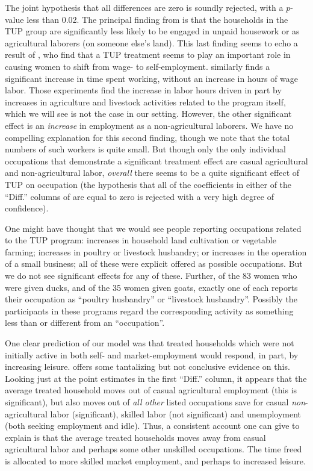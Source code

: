 \documentclass[11pt]{article}
\begin{document}
The joint hypothesis that all differences are zero is soundly
rejected, with a \(p\)-value less than 0.02.  The principal
finding from  is that the households in the TUP group
are significantly less likely to be engaged in unpaid housework or as
agricultural laborers (on someone else's land).  This last finding seems to
echo a result of \cite{bandiera2017}, who find that a TUP treatment
seems to play an important role in causing women to shift from wage-
to self-employment. \cite{banerjee2015} similarly finds a significant increase in
time spent working, without an increase in hours of wage labor. Those experiments
find the increase in labor hours driven in part by increases in agriculture and
livestock activities related to the program itself, which we will see is not the case
in our setting. However, the other significant effect is an
\emph{increase} in employment as a non-agricultural laborers.  We have no
compelling explanation for this second finding, though we note that
the total numbers of such workers is quite small.  But though only the
only individual occupations that demonstrate a significant treatment
effect are casual agricultural and non-agricultural labor, \emph{overall}
there seems to be a quite significant effect of TUP on occupation (the
hypothesis that all of the coefficients in either of the ``Diff.''  columns of
 are equal to zero is rejected with a very high degree
of confidence).

One might have thought that we would see people reporting occupations
related to the TUP program: increases in household land cultivation or
vegetable farming; increases in poultry or livestock husbandry; or
increases in the operation of a small business; all of these were
explicit offered as possible occupations.  But we do not see
significant effects for any of these. Further, of the 83 women who were
given ducks, and of the 35 women given goats, exactly one of each
reports their occupation as ``poultry husbandry'' or ``livestock
husbandry''.  Possibly the participants in these programs regard 
the corresponding activity as something less than or different from an
``occupation''.

One clear prediction of our model was that treated households which
were not initially active in both self- and market-employment would
respond, in part, by increasing leisure.   offers some
tantalizing but not conclusive evidence on this.  Looking just at the
point estimates in the first ``Diff.'' column, it appears that the
average treated household moves out of casual agricultural employment
(this is significant), but also moves out of \emph{all other} listed
occupations save for casual \emph{non}-agricultural labor (significant),
skilled labor (not significant) and unemployment (both seeking
employment and idle).  Thus, a consistent account one can give to explain
 is that the average treated households moves away
from casual agricultural labor and perhaps some other unskilled
occupations.  The time freed is allocated to more skilled market
employment, and perhaps to increased leisure.
\end{document}
